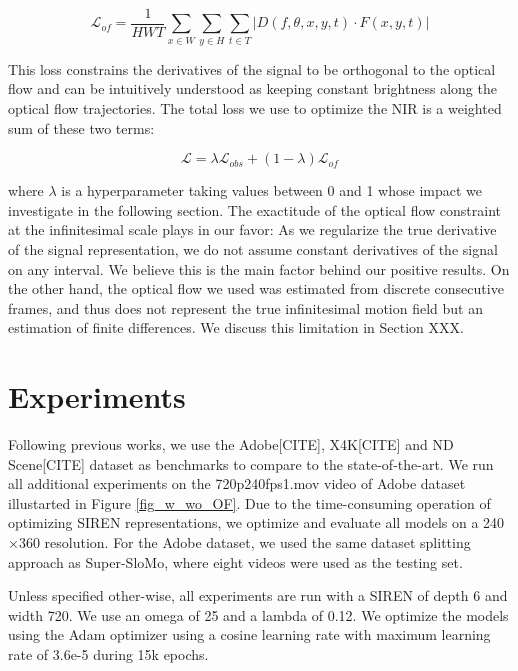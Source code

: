 \documentclass{article}
\begin{document}
\begin{equation}
\mathcal{L}_{of} = \frac{1}{HWT} \sum_{x \in W}\sum_{y \in H}\sum_{t \in T} | D(f, \theta, x, y, t) \cdot F(x, y, t) |
\end{equation}

This loss constrains the derivatives of the signal to be orthogonal to the optical flow and
can be intuitively understood as keeping constant brightness along the optical flow trajectories.
The total loss we use to optimize the NIR is a weighted sum of these two terms:

\begin{equation}
\mathcal{L} = \lambda \mathcal{L}_{obs} + (1-\lambda) \mathcal{L}_{of}
\end{equation}

where $\lambda$ is a hyperparameter taking values between 0 and 1 whose impact we investigate in the following section.
The exactitude of the optical flow constraint at the infinitesimal scale plays in our favor:
As we regularize the true derivative of the signal representation,
we do not assume constant derivatives of the signal on any interval.
We believe this is the main factor behind our positive results.
On the other hand, the optical flow we used was estimated from discrete consecutive frames,
and thus does not represent the true infinitesimal motion field but an estimation of finite differences.
We discuss this limitation in Section XXX.

\section{Experiments}

Following previous works, we use the Adobe[CITE], X4K[CITE] and ND Scene[CITE] dataset as benchmarks to compare to the state-of-the-art.
We run all additional experiments on the 720p240fps1.mov video of Adobe dataset illustarted in Figure \ref{fig_w_wo_OF}.
Due to the time-consuming operation of optimizing SIREN representations, we optimize and evaluate all models on a 240$\times$360 resolution.
For the Adobe dataset, we used the same dataset splitting approach as Super-SloMo, where eight videos were used as the testing set.

Unless specified other-wise, all experiments are run with a SIREN of depth 6 and width 720.
We use an omega of 25 and a lambda of 0.12.
We optimize the models using the Adam optimizer using a cosine learning rate with maximum learning rate of 3.6e-5 during 15k epochs.
\end{document}
